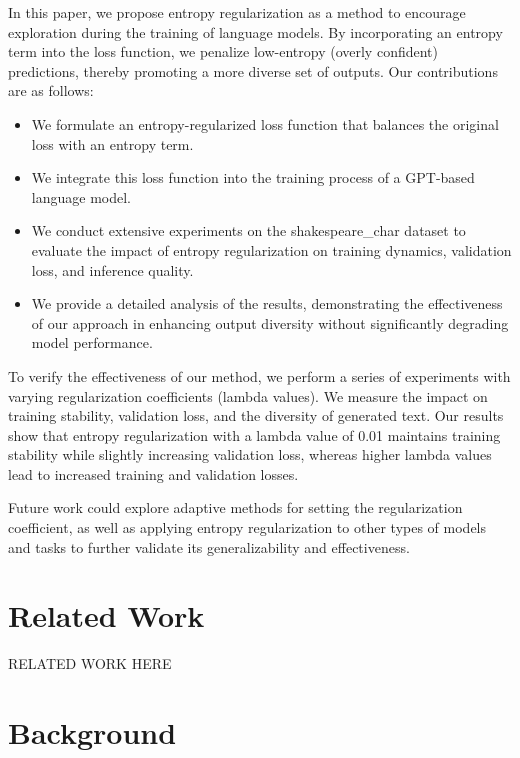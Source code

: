 \documentclass{article} %
\begin{document}
In this paper, we propose entropy regularization as a method to encourage exploration during the training of language models. By incorporating an entropy term into the loss function, we penalize low-entropy (overly confident) predictions, thereby promoting a more diverse set of outputs. Our contributions are as follows:
\begin{itemize}
    \item We formulate an entropy-regularized loss function that balances the original loss with an entropy term.
    \item We integrate this loss function into the training process of a GPT-based language model.
    \item We conduct extensive experiments on the shakespeare\_char dataset to evaluate the impact of entropy regularization on training dynamics, validation loss, and inference quality.
    \item We provide a detailed analysis of the results, demonstrating the effectiveness of our approach in enhancing output diversity without significantly degrading model performance.
\end{itemize}

To verify the effectiveness of our method, we perform a series of experiments with varying regularization coefficients (lambda values). We measure the impact on training stability, validation loss, and the diversity of generated text. Our results show that entropy regularization with a lambda value of 0.01 maintains training stability while slightly increasing validation loss, whereas higher lambda values lead to increased training and validation losses.

Future work could explore adaptive methods for setting the regularization coefficient, as well as applying entropy regularization to other types of models and tasks to further validate its generalizability and effectiveness.

\section{Related Work}
\label{sec:related}
RELATED WORK HERE

\section{Background}
\label{sec:background}
\end{document}
